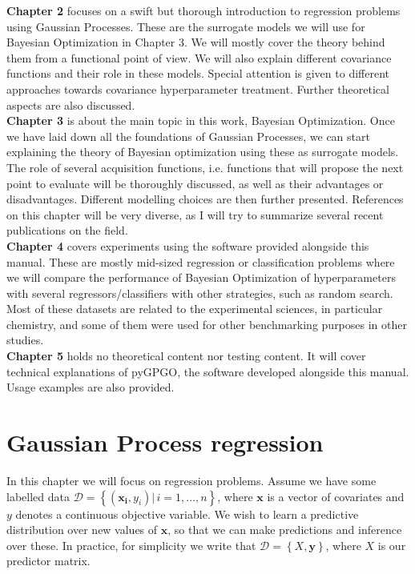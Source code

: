 \documentclass[10pt,a4paper,twoside]{book}
\begin{document}
\textbf{Chapter 2} focuses on a swift but thorough introduction to regression problems using Gaussian Processes. These are the surrogate models we will use for Bayesian Optimization in Chapter 3. We will mostly  cover the theory behind them from a functional point of view. We will also explain different covariance functions and their role in these models. Special attention is given to different approaches towards covariance hyperparameter treatment. Further theoretical aspects are also discussed.\\

\textbf{Chapter 3} is about the main topic in this work, Bayesian Optimization. Once we have laid down all the foundations of Gaussian Processes, we can start explaining the theory of Bayesian optimization using these as surrogate models. The role of several acquisition functions, i.e. functions that will propose the next point to evaluate will be thoroughly discussed, as well as their advantages or disadvantages. Different modelling choices are then further presented. References on this chapter will be very diverse, as I will try to summarize several recent publications on the field.  \\

\textbf{Chapter 4} covers experiments using the software provided alongside this manual. These are mostly mid-sized regression or classification problems where we will compare the performance of Bayesian Optimization of hyperparameters with several regressors/classifiers with other strategies, such as random search. Most of these datasets are related to the experimental sciences, in particular chemistry, and some of them were used for other benchmarking purposes in other studies. \\

\textbf{Chapter 5} holds no theoretical content nor testing content. It will cover technical explanations of pyGPGO, the software developed alongside this manual. Usage examples are also provided. 

\chapter{Gaussian Process regression}

 In this chapter we will focus on regression problems. Assume we have some labelled data $\mathcal{D} = \left\lbrace \left(\boldsymbol{x_i}, y_i\right) |\, i = 1,\dots,n\right\rbrace$, where $\boldsymbol{x}$ is a vector of covariates and $y$ denotes a continuous objective variable. We wish to learn a predictive distribution over new values of $\boldsymbol{x}$, so that we can make predictions and inference over these. In practice, for simplicity we write that $\mathcal{D} = \left\lbrace X, \boldsymbol{y}\right\rbrace$, where $X$ is our predictor matrix.\\
\end{document}

